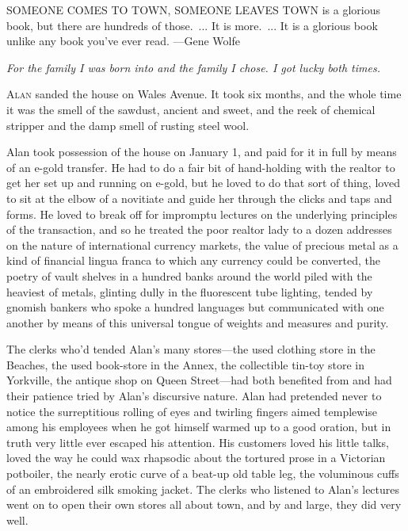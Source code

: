 \newpage

SOMEONE COMES TO TOWN, SOMEONE LEAVES TOWN is a glorious book, but
there are hundreds of those.~...  It is more.~...  It is a glorious
book unlike any book you've ever read.
{\flushright ---Gene Wolfe}

\vspace{1cm}

\noindent
\textit{For the family I was born into and the family I chose.  I got lucky
both times.}

\vspace{2in}

\lettrine[lines=3, lhang=.5, nindent=0pt, findent=2pt]{A}{lan} sanded the house on Wales Avenue.  It took six months, and the
whole time it was the smell of the sawdust, ancient and sweet, and the
reek of chemical stripper and the damp smell of rusting steel wool.

Alan took possession of the house on January 1, and paid for it in
full by means of an e-gold transfer.  He had to do a fair bit of
hand-holding with the realtor to get her set up and running on e-gold,
but he loved to do that sort of thing, loved to sit at the elbow of a
novitiate and guide her through the clicks and taps and forms.  He
loved to break off for impromptu lectures on the underlying principles
of the transaction, and so he treated the poor realtor lady to a dozen
addresses on the nature of international currency markets, the value
of precious metal as a kind of financial lingua franca to which any
currency could be converted, the poetry of vault shelves in a hundred
banks around the world piled with the heaviest of metals, glinting
dully in the fluorescent tube lighting, tended by gnomish bankers who
spoke a hundred languages but communicated with one another by means
of this universal tongue of weights and measures and purity.

The clerks who'd tended Alan's many stores---the used clothing store
in the Beaches, the used book-store in the Annex, the collectible
tin-toy store in Yorkville, the antique shop on Queen Street---had
both benefited from and had their patience tried by Alan's discursive
nature.  Alan had pretended never to notice the surreptitious rolling
of eyes and twirling fingers aimed templewise among his employees when
he got himself warmed up to a good oration, but in truth very little
ever escaped his attention.  His customers loved his little talks,
loved the way he could wax rhapsodic about the tortured prose in a
Victorian potboiler, the nearly erotic curve of a beat-up old table
leg, the voluminous cuffs of an embroidered silk smoking jacket.  The
clerks who listened to Alan's lectures went on to open their own
stores all about town, and by and large, they did very well.

